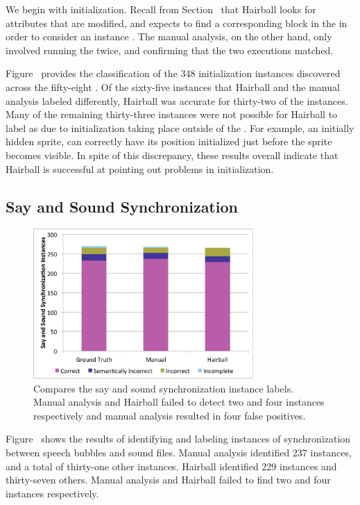 We begin with initialization. Recall from Section~ that
Hairball looks for attributes that are modified, and expects to find a
corresponding \abs{} block in the \initzone{} in order to consider an instance
\correct{}. The manual analysis, on the other hand, only involved running the
\sprogram{} twice, and confirming that the two executions matched.

Figure~ provides the classification of the 348
initialization instances discovered across the fifty-eight . Of the
sixty-five instances that Hairball and the manual analysis labeled differently,
Hairball was accurate for thirty-two of the instances. Many of the remaining
thirty-three instances were not possible for Hairball to label as \correct{}
due to initialization taking place outside of the \initzone{}. For example, an
initially hidden sprite, can correctly have its position initialized just
before the sprite becomes visible. In spite of this discrepancy, these results
overall indicate that Hairball is successful at pointing out problems in
initialization.

\subsection{Say and Sound Synchronization}
\begin{figure}[!t]
\centering
\includegraphics[trim=.3in .15in .3in .15in, clip,
  width=3.3in]{graphs/AutoSaySoundSync.eps}
\caption{Compares the say and sound synchronization instance labels. Manual
  analysis and Hairball failed to detect two and four instances respectively
  and manual analysis resulted in four false positives.}
\end{figure}


Figure~ shows the results of identifying and
labeling instances of synchronization between speech bubbles and sound
files. Manual analysis identified 237 \correct{} instances, and a total of
thirty-one other instances. Hairball identified 229 \correct{} instances and
thirty-seven others. Manual analysis and Hairball failed to find two and four
instances respectively.

